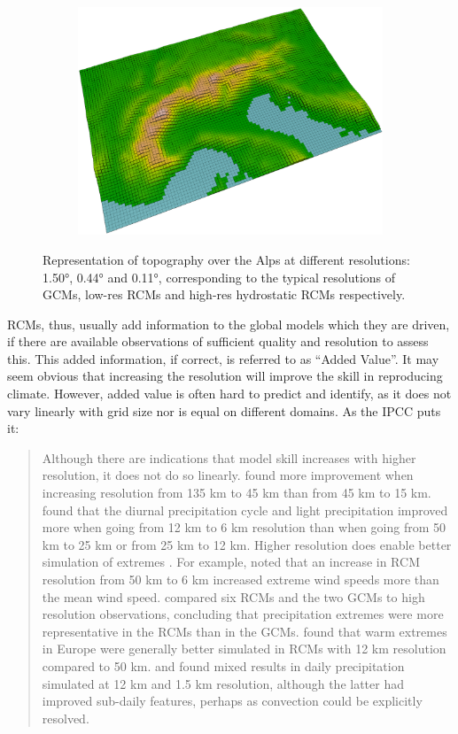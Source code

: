\begin{figure}
\begin{subfigure}{0.4\textheight}
        \includegraphics[width=\textwidth]{figures/topo_av/12_3d}
    \end{subfigure}
    \decoRule
    \caption[Topography representation over the Alps at different resolution]{
        Representation of topography over the Alps at different resolutions: \ang{1.50}, \ang{0.44} and \ang{0.11}, corresponding to the typical resolutions of GCMs, low-res RCMs and high-res hydrostatic RCMs respectively.
    }\label{fig:topo_av}
\end{figure}

RCMs, thus, usually add information to the global models which they are driven, if there are available observations of sufficient quality and resolution to assess this. This added information, if correct, is referred to as ``Added Value''.
It may seem obvious that increasing the resolution will improve the skill in reproducing climate.
However, added value is often hard to predict and identify, as it does not vary linearly with grid size nor is equal on different domains. As the IPCC \citep[][section 9.6.3]{IPCC2013} puts it:
\blockquote{
Although there are indications that model skill increases with higher resolution, it does not do so linearly. \citet{Rojas2006} found more improvement when increasing resolution from 135 km to 45 km than from 45 km to 15 km. \citet{Walther2013} found that the diurnal precipitation cycle and light precipitation improved more when going from 12 km to 6 km resolution than when going from 50 km to 25 km or from 25 km to 12 km. Higher resolution does enable better simulation of extremes \citep{Seneviratne2012}. For example, \citet{Pryor2012} noted that an increase in RCM resolution from 50 km to 6 km increased extreme wind speeds more than the mean wind speed. \citet{Kawazoe2013} compared six RCMs and the two GCMs to high resolution observations, concluding that precipitation extremes were more representative in the RCMs than in the GCMs. \citet{Vautard2013} found that warm extremes in Europe were generally better simulated in RCMs with 12 km resolution compared to 50 km. \citet{Kendon2012} and \citet{Chan2012} found mixed results in daily precipitation simulated at 12 km and 1.5 km resolution, although the latter had improved sub-daily features, perhaps as convection could be explicitly resolved.
}

